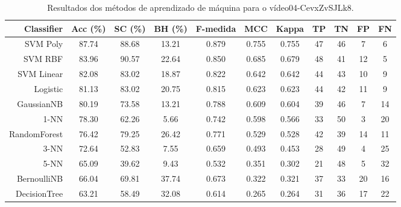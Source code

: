 \begin{table}[!htb]
\centering
\caption{Resultados dos métodos de aprendizado de máquina para o vídeo04-CevxZvSJLk8.}
\label{tab:04-CevxZvSJLk8}
\begin{tabular}{r|c|c|c|c|c|c|c|c|c|c}
\hline\hline
Classifier & Acc (\%) & SC (\%) & BH (\%) & F-medida & MCC & Kappa & TP & TN & FP & FN \\ \hline
SVM Poly & 87.74 & 88.68 & 13.21 & 0.879 & 0.755 & 0.755 & 47 & 46 & 7 & 6 \\ 
SVM RBF & 83.96 & 90.57 & 22.64 & 0.850 & 0.685 & 0.679 & 48 & 41 & 12 & 5 \\ 
SVM Linear & 82.08 & 83.02 & 18.87 & 0.822 & 0.642 & 0.642 & 44 & 43 & 10 & 9 \\ 
Logistic & 81.13 & 83.02 & 20.75 & 0.815 & 0.623 & 0.623 & 44 & 42 & 11 & 9 \\ 
GaussianNB & 80.19 & 73.58 & 13.21 & 0.788 & 0.609 & 0.604 & 39 & 46 & 7 & 14 \\ 
1-NN & 78.30 & 62.26 & 5.66 & 0.742 & 0.598 & 0.566 & 33 & 50 & 3 & 20 \\ 
RandomForest & 76.42 & 79.25 & 26.42 & 0.771 & 0.529 & 0.528 & 42 & 39 & 14 & 11 \\ 
3-NN & 72.64 & 52.83 & 7.55 & 0.659 & 0.493 & 0.453 & 28 & 49 & 4 & 25 \\ 
5-NN & 65.09 & 39.62 & 9.43 & 0.532 & 0.351 & 0.302 & 21 & 48 & 5 & 32 \\ 
BernoulliNB & 66.04 & 69.81 & 37.74 & 0.673 & 0.322 & 0.321 & 37 & 33 & 20 & 16 \\ 
DecisionTree & 63.21 & 58.49 & 32.08 & 0.614 & 0.265 & 0.264 & 31 & 36 & 17 & 22 \\ 
\hline\hline
\end{tabular}
\end{table}
